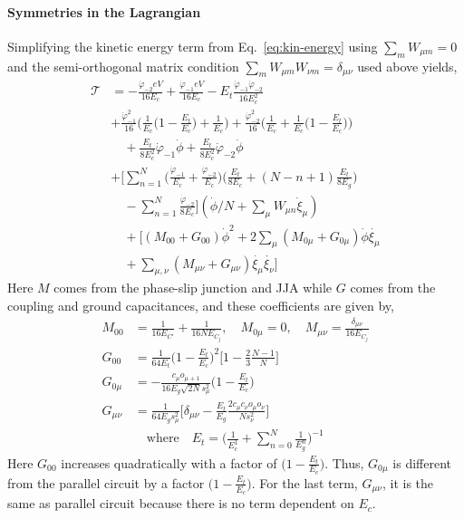 \documentclass[prx,showpacs,notitlepage,twocolumn,superscriptaddress,nofootinbib,preprintnumbers,floatfix]{revtex4-2}
\begin{document}
\paragraph{Symmetries in the Lagrangian}
Simplifying the kinetic energy term from Eq.~\ref{eq:kin-energy} using $\sum_m W_{\mu m}=0$ and the semi-orthogonal matrix condition $\sum_m W_{\mu m}W_{\nu m}=\delta_{\mu\nu}$ used above yields,
\begin{align}
\mathcal{T}&=-\frac{\dot{\varphi}_{-2}eV}{16E_c}+\frac{\dot{\varphi}_{-1}eV}{16E_c}-E_t\frac{\dot{\varphi}_{-1}\dot{\varphi}_{-2}}{16E_c^2}\nonumber\\
    &+\frac{\dot{\varphi}^2_{-1}}{16}\Big(\frac{1}{E_c}\Big(1-\frac{E_t}{E_c}\Big)+\frac{1}{E_c}\Big)+\frac{\dot{\varphi}^2_{-2}}{16}\Big(\frac{1}{E_c}+\frac{1}{E_c}\Big(1-\frac{E_t}{E_c}\Big)\Big)\nonumber\\&\quad+\frac{E_t}{8E_c^2}\dot{\varphi}_{-1}\dot{\phi}+\frac{E_t}{8E_c^2}\dot{\varphi}_{-2}\dot{\phi}\nonumber\\
      &+\Big[\sum_{n=1}^N\Big(\frac{\dot{\varphi}_{-1}}{E_c}+\frac{\dot{\varphi}_{-2}}{E_c}\Big)\Big(\frac{E_t}{8E_c}+(N-n+1)\frac{E_t}{8E_g}\Big)\nonumber\\&\quad-\sum_{n=1}^N\frac{\dot{\varphi}_{-2}}{8E_c}\Big](\dot{\phi}/N+\sum_\mu W_{\mu n}\dot{\xi}_\mu)\nonumber\\
    &\quad+\Big[(M_{00}+G_{00})\dot{\phi}^2+2\sum_{\mu}(M_{0\mu}+G_{0\mu})\dot{\phi}\dot{\xi_\mu}\nonumber\\&\quad+\sum_{\mu,\nu}(M_{\mu\nu}+G_{\mu\nu})\dot{\xi_\mu}\dot{\xi_\nu}\Big]    
    \end{align}
    Here $M$ comes from the phase-slip junction and JJA while $G$ comes from the coupling and ground capacitances, and these coefficients are given by,
    \begin{align}
    M_{00}&=\frac{1}{16E_{C'}}+\frac{1}{16NE_{C_j}},\quad M_{0\mu}=0,\quad    M_{\mu\nu}=\frac{\delta_{\mu\nu}}{16E_{C_j}}\\
    G_{00}&=\frac{1}{64E_t}\Big(1-\frac{E_t}{E_c}\Big)^2\Big[1-\frac{2}{3}\frac{N-1}{N}\Big]\\
    G_{0\mu}&=-\frac{c_\mu o_{\mu+1}}{16E_g\sqrt{2N}s_\mu^2}\Big(1-\frac{E_t}{E_c}\Big)\\
    G_{\mu\nu}&=\frac{1}{64E_gs_\mu^2}\Big[\delta_{\mu\nu}-\frac{E_t}{E_g}\frac{2c_\mu c_\nu o_\mu o_\nu}{N s_\nu^2}\Big]\\&\quad\text{where}\quad E_t=\Big(\frac{1}{E_c^1}+\sum_{n=0}^N\frac{1}{E^n_g}\Big)^{-1}\nonumber
\end{align}
Here $G_{00}$ increases quadratically with a factor of $\Big(1-\frac{E_t}{E_c}\Big)$. Thus, $G_{0\mu}$ is different from the parallel circuit by a factor $\Big(1-\frac{E_t}{E_c}\Big)$. 
For the last term, $G_{\mu\nu}$, it is the same as parallel circuit because there is no term dependent on $E_c$. 
\end{document}
